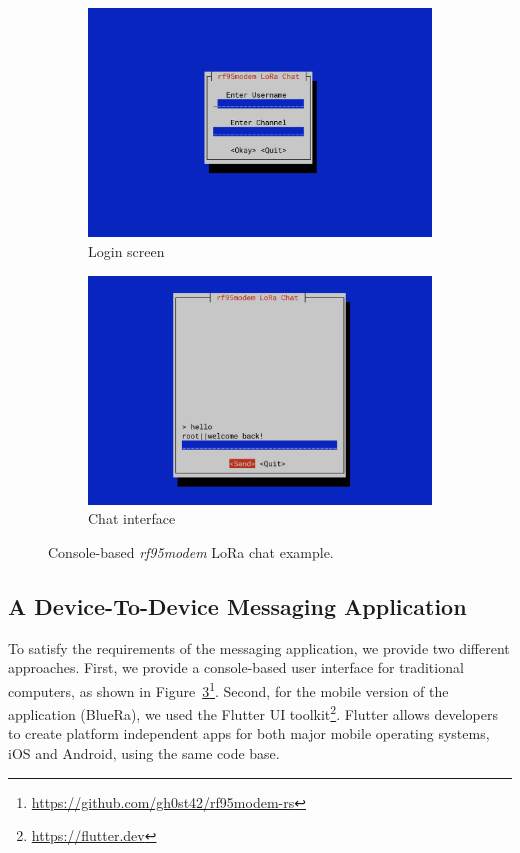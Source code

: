 \begin{figure}
\centering
\begin{subfigure}{.5\textwidth}
  \centering
  \includegraphics[width=.95\linewidth]{gfx/lorachat_1.png}
  \caption{Login screen}
  \label{fig:lorachat:login}
\end{subfigure}%
\begin{subfigure}{.5\textwidth}
  \centering
  \includegraphics[width=.95\linewidth]{gfx/lorachat_2.png}
  \caption{Chat interface}
  \label{fig:lorachat:chat}
\end{subfigure}
\caption{Console-based \textit{rf95modem} LoRa chat example.}
\label{fig:lorachat}
\end{figure}


\subsection{A Device-To-Device Messaging Application}
To satisfy the requirements of the messaging application, we provide two different approaches.
First, we provide a console-based user interface for traditional computers, as shown in Figure~\ref{fig:lorachat}\footnote{\url{https://github.com/gh0st42/rf95modem-rs}}.
Second, for the mobile version of the application (BlueRa), we used the Flutter UI toolkit\footnote{\url{https://flutter.dev}}.
Flutter allows developers to create platform independent apps for both major mobile operating systems, iOS and Android, using the same code base.

